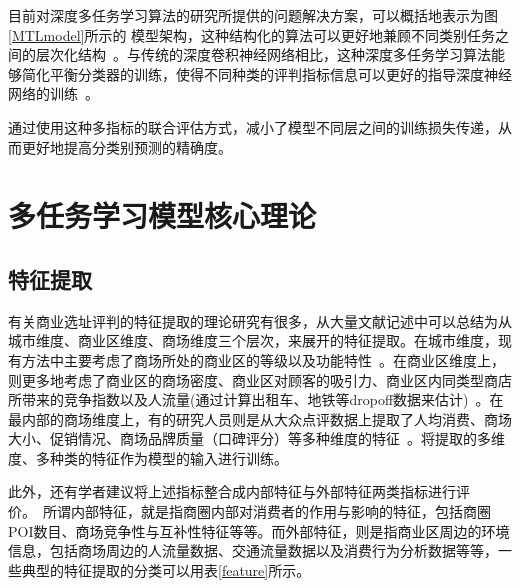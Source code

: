 \documentclass{llncs}
\begin{document}
目前对深度多任务学习算法的研究所提供的问题解决方案，可以概括地表示为图\ref{MTLmodel}所示的 模型架构，这种结构化的算法可以更好地兼顾不同类别任务之间的层次化结构~\cite{ZhaoQiLu}。与传统的深度卷积神经网络相比，这种深度多任务学习算法能够简化平衡分类器的训练，使得不同种类的评判指标信息可以更好的指导深度神经网络的训练~\cite{DataClassify}。

通过使用这种多指标的联合评估方式，减小了模型不同层之间的训练损失传递，从而更好地提高分类别预测的精确度。



\section{多任务学习模型核心理论}
\subsection{特征提取}
有关商业选址评判的特征提取的理论研究有很多，从大量文献记述中可以总结为从城市维度、商业区维度、商场维度三个层次，来展开的特征提取。在城市维度，现有方法中主要考虑了商场所处的商业区的等级以及功能特性~\cite{cityLevel}。在商业区维度上，则更多地考虑了商业区的商场密度、商业区对顾客的吸引力、商业区内同类型商店所带来的竞争指数以及人流量(通过计算出租车、地铁等dropoff数据来估计)~\cite{traffic}。在最内部的商场维度上，有的研究人员则是从大众点评数据上提取了人均消费、商场大小、促销情况、商场品牌质量（口碑评分）等多种维度的特征~\cite{mallLevel}。将提取的多维度、多种类的特征作为模型的输入进行训练。

此外，还有学者建议将上述指标整合成内部特征与外部特征两类指标进行评价。~\cite{IEfeatures}所谓内部特征，就是指商圈内部对消费者的作用与影响的特征，包括商圈POI数目、商场竞争性与互补性特征等等。而外部特征，则是指商业区周边的环境信息，包括商场周边的人流量数据、交通流量数据以及消费行为分析数据等等，一些典型的特征提取的分类可以用表\ref{feature}所示。
\end{document}
